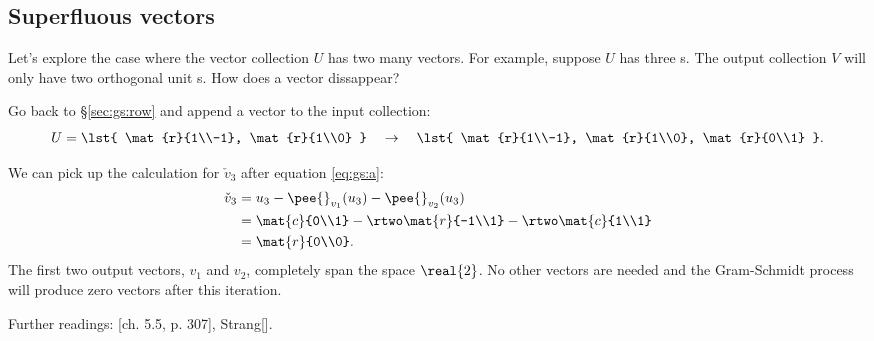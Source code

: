 \subsection{Superfluous vectors}
Let's explore the case where the vector collection $U$ has two many vectors. For example, suppose $U$ has three \vv s. The output collection $V$ will only have two orthogonal unit \vv s. How does a vector dissappear?

Go back to \S\eqref{sec:gs:row} and append a vector to the input collection:
\begin{equation}
  U = \lst{
  \mat{r}{1\\-1},
  \mat{r}{1\\0}
  }
  \quad \rightarrow \quad
  \lst{
  \mat{r}{1\\-1},
  \mat{r}{1\\0},
  \mat{r}{0\\1}
  }.
\end{equation}

We can pick up the calculation for $\check{v}_{3}$ after equation \eqref{eq:gs:a}:
\begin{equation}
  \begin{split}
    \check{v}_{3} &= u_{3} - \pee{}_{v_{1}}(u_{3}) - \pee{}_{v_{2}}(u_{3})\\
    & = \mat{c}{0\\1} - \rtwo\mat{r}{-1\\1} - \rtwo\mat{c}{1\\1}\\
    & = \mat{r}{0\\0}.
  \end{split}
\end{equation}
The first two output vectors, $v_{1}$ and $v_{2}$, completely span the space $\real{2}$. No other vectors are needed and the Gram-Schmidt process will produce zero vectors after this iteration.

Further readings: \cite[ch. 5.5, p. 307]{Meyer}[ch. 5.5, p. 307]{}, Strang[]{}.


\endinput